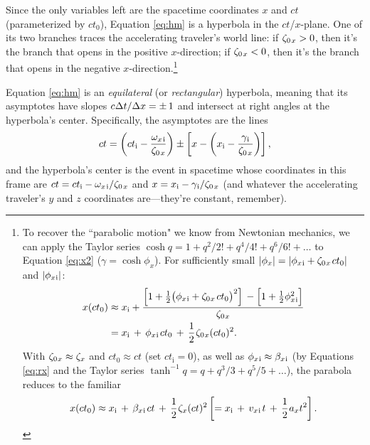 \documentclass[12pt]{article}
\begin{document}
Since the only variables left are the spacetime coordinates $x$ and $ct$ (parameterized by $ct_0$), Equation \ref{eq:hm} is a hyperbola in the $ct$/$x$-plane. One of its two branches traces the accelerating traveler's world line: if $\zeta_{0 \mkern2mu x} > 0$, then it's the branch that opens in the positive $x$-direction; if $\zeta_{0 \mkern2mu x} < 0$, then it's the branch that opens in the negative $x$-direction.\footnote{To recover the ``parabolic motion" we know from Newtonian mechanics, we can apply the Taylor series $\cosh{q} = 1 + q^2/2! + q^4/4! + q^6/6! + \dots$ to Equation \ref{eq:x2} ($\gamma = \cosh{\phi_x}$). For sufficiently small $| \phi_x | = | \phi_{x \mkern1mu \textrm{i} } + \zeta_{0 \mkern1mu x} \mkern2mu ct_0 |$ and $| \phi_{x \mkern1mu \textrm{i} } |$:
\begin{equation*}
\begin{split}
x(ct_0) &\approx x_{\mathrm{i}} + \dfrac{ \left[ 1 + \frac{1}{2} \big( \phi_{x \mkern1mu \textrm{i} } + \zeta_{0 \mkern1mu x} \mkern2mu ct_0 \big)^2 \right] \vphantom{\big|_{\mathstrut_{\mathstrut_{A}}}}  - \Bigl[ 1 + \frac{1}{2} \phi^2_{x \mkern1mu \textrm{i} } \Bigr] }{ \zeta_{0 \mkern1mu x}}\\
&=  x_{\mathrm{i}} \,  + \, \phi_{x \mkern1mu \textrm{i} } \mkern2mu ct_0 \, + \, \dfrac{1}{2} \mkern1mu \zeta_{0 \mkern1mu x} (ct_0)^2 .
\end{split}
\end{equation*}
With $\zeta_{0 \mkern1mu x} \approx \zeta_{x}$ and $ct_0 \approx ct$ (set $ct_{\mathrm{i}} = 0$), as well as $\phi_{x \mkern1mu \textrm{i} } \approx \beta_{x \mkern1mu \mathrm{i} }$ (by Equations \ref{eq:rx} and the Taylor series $\tanh^{-1}{q} = q + q^3/3 + q^5/5 + \dots$), the parabola reduces to the familiar
\begin{equation*}
x(ct_0) \approx x_{\mathrm{i}} \, + \, \beta_{x \mkern1mu \mathrm{i} } \mkern2mu ct \, + \, \dfrac{1}{2} \mkern1mu \zeta_{x} (ct)^2 \left[ = x_{\mathrm{i}} \, + \, v_{x \mkern1mu \mathrm{i} } \mkern2mu t \, + \, \dfrac{1}{2} \mkern1mu a_{x} t^2 \right] .
\end{equation*}
}

Equation \ref{eq:hm} is an \emph{equilateral} (or \emph{rectangular}) hyperbola, meaning that its asymptotes have slopes $c \mkern.5mu \Delta t / \Delta x = \pm \, 1$ and intersect at right angles at the hyperbola's center. Specifically, the asymptotes are the lines
\begin{equation*}
ct = \left( ct_{\mathrm{i}} - \dfrac{\omega_{x \mkern2mu \textrm{i} }}{ \zeta_{0 \mkern2mu x}} \right) \pm \left[  x - \left( x_{\mathrm{i}} - \dfrac{\gamma_{\mkern1mu \mathrm{i}}}{ \zeta_{0 \mkern2mu x}} \right) \right],
\end{equation*}
and the hyperbola's center is the event in spacetime whose coordinates in this frame are $ct = ct_{\mathrm{i}} - \omega_{x \mkern2mu \textrm{i} } / \zeta_{0 \mkern2mu x}$ and $x = x_{\mathrm{i}} - \gamma_{\mkern1mu \mathrm{i}} / \zeta_{0 \mkern2mu x}$ (and whatever the accelerating traveler's $y$ and $z$ coordinates are---they're constant, remember). 
\end{document}
